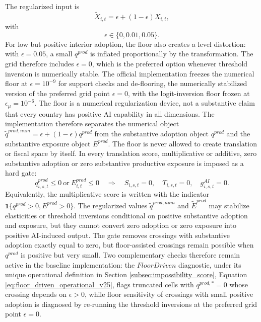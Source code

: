 \documentclass[11pt,a4paper]{article}
\begin{document}
The regularized input is
\begin{equation}
    \tilde X_{i,t}=\epsilon+(1-\epsilon)X_{i,t},
\end{equation}
with
\begin{equation}
    \epsilon\in\{0,0.01,0.05\}.
\end{equation}
For low but positive interior adoption, the floor also creates a level distortion: with $\epsilon=0.05$, a small $q^{prod}$ is inflated proportionally by the transformation. The grid therefore includes $\epsilon=0$, which is the preferred option whenever threshold inversion is numerically stable. The official implementation freezes the numerical floor at $\epsilon=10^{-9}$ for support checks and de-flooring, the numerically stabilized version of the preferred grid point $\epsilon=0$, with the logit-inversion floor frozen at $\epsilon_\mu=10^{-6}$.
The floor is a numerical regularization device, not a substantive claim that every country has positive AI capability in all dimensions. The implementation therefore separates the numerical object $\tilde q^{prod,num}=\epsilon+(1-\epsilon)q^{prod}$ from the substantive adoption object $q^{prod}$ and the substantive exposure object $E^{prod}$. The floor is never allowed to create translation or fiscal space by itself. In every translation score, multiplicative or additive, zero substantive adoption or zero substantive productive exposure is imposed as a hard gate:
\begin{equation}\label{eq:q_zero_gate_v21}
    q^{prod}_{i,s,t}\leq0\ \text{or}\ E^{prod}_{i,t}\leq0\quad\Longrightarrow\quad
    S_{i,s,t}=0,\quad T_{i,s,t}=0,\quad g^{AI}_{i,s,t}=0.
\end{equation}
Equivalently, the multiplicative score is written with the indicator $\mathbf{1}\{q^{prod}>0,E^{prod}>0\}$. The regularized values $\tilde q^{prod,num}$ and $\tilde E^{prod}$ may stabilize elasticities or threshold inversions conditional on positive substantive adoption and exposure, but they cannot convert zero adoption or zero exposure into positive AI-induced output. The gate removes crossings with substantive adoption exactly equal to zero, but floor-assisted crossings remain possible when $q^{prod}$ is positive but very small. Two complementary checks therefore remain active in the baseline implementation: the $FloorDriven$ diagnostic, under its unique operational definition in Section \ref{subsec:impossibility_score}, Equation \eqref{eq:floor_driven_operational_v25}, flags truncated cells with $q^{prod,*}=0$ whose crossing depends on $\epsilon>0$, while floor sensitivity of crossings with small positive adoption is diagnosed by re-running the threshold inversions at the preferred grid point $\epsilon=0$.
\end{document}
